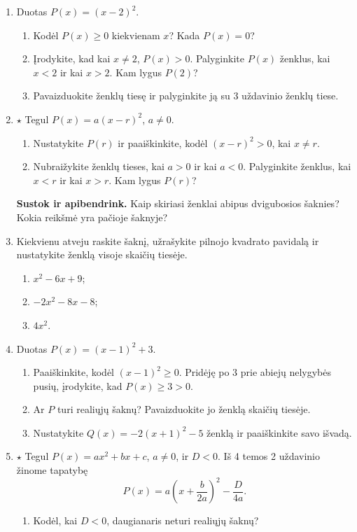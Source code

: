 \documentclass[12pt,a4paper]{article}
\begin{document}
\begin{enumerate}[series=uzdaviniai]
\begin{multicols}{2}
\begin{enumerate}
\end{enumerate}\end{multicols}
\item Duotas $P(x)=(x-2)^2$.
\begin{enumerate}
\item Kodėl $P(x)\geq0$ kiekvienam $x$? Kada $P(x)=0$?
\item Įrodykite, kad kai $x\ne2$, $P(x)>0$. Palyginkite $P(x)$ ženklus, kai $x<2$ ir kai $x>2$. Kam lygus $P(2)$?
\item Pavaizduokite ženklų tiesę ir palyginkite ją su 3 uždavinio ženklų tiese.
\end{enumerate}
\item $\star$ Tegul $P(x)=a(x-r)^2$, $a\ne0$.
\begin{enumerate}
\item Nustatykite $P(r)$ ir paaiškinkite, kodėl $(x-r)^2>0$, kai $x\ne r$.
\item Nubraižykite ženklų tieses, kai $a>0$ ir kai $a<0$. Palyginkite ženklus, kai $x<r$ ir kai $x>r$. Kam lygus $P(r)$?
\end{enumerate}
\par\medskip
\textbf{Sustok ir apibendrink.} Kaip skiriasi ženklai abipus dvigubosios šaknies? Kokia reikšmė yra pačioje šaknyje?
\item Kiekvienu atveju raskite šaknį, užrašykite pilnojo kvadrato pavidalą ir nustatykite ženklą visoje skaičių tiesėje.
\begin{enumerate}
\item $x^2-6x+9$; \item $-2x^2-8x-8$; \item $4x^2$.
\end{enumerate}
\item Duotas $P(x)=(x-1)^2+3$.
\begin{enumerate}
\item Paaiškinkite, kodėl $(x-1)^2\geq0$. Pridėję po $3$ prie abiejų nelygybės pusių, įrodykite, kad $P(x)\geq3>0$.
\item Ar $P$ turi realiųjų šaknų? Pavaizduokite jo ženklą skaičių tiesėje.
\item Nustatykite $Q(x)=-2(x+1)^2-5$ ženklą ir paaiškinkite savo išvadą.
\end{enumerate}
\item $\star$ Tegul $P(x)=ax^2+bx+c$, $a\ne0$, ir $D<0$. Iš 4 temos 2 uždavinio žinome tapatybę
\[P(x)=a\left(x+\frac{b}{2a}\right)^2-\frac{D}{4a}.\]
\begin{enumerate}
\item Kodėl, kai $D<0$, daugianaris neturi realiųjų šaknų?

\end{enumerate}
\end{enumerate}
\end{document}

